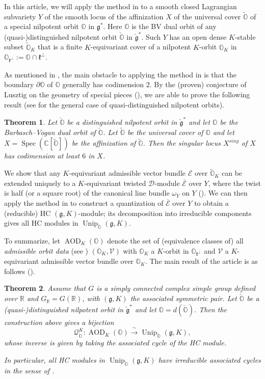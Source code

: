 \documentclass[11pt, a4paper]{amsart}
\newcommand{\C}{\mathbb{C}}
\newcommand{\g}{\mathfrak{g}}
\newcommand{\orb}{\mathbb{O}}
\newcommand{\orbk}{\orb_{K}}
\newcommand{\torbk}{\widetilde{\orb}_{K}}
\newcommand{\fg}{\mathfrak{g}}
\newcommand{\fk}{\mathfrak{k}}
\newcommand{\ckfg}{{\check{\fg}}}
\newcommand{\ckorb}{\check{\orb}}
\newcommand{\cE}{\mathcal{E}}
\newcommand{\cV}{\mathcal{V}}
\newcommand{\sD}{\mathscr{D}}
\DeclareMathOperator{\AOD}{AOD}
\DeclareMathOperator{\Unip}{Unip}
\newcommand{\AODK}{\AOD_K}
\newcommand{\UnipOv}{\Unip_{\ckorb}}
\newcommand{\R}{\mathbb{R}}
\newcommand{\quan}{\mathcal{Q}}
\newcommand{\GR}{G_\R}
\newcommand{\spec}{\operatorname{Spec}}
\newtheorem{Thm}{Theorem}[subsection]
\theoremstyle{definition}
\numberwithin{equation}{section}
\begin{document}
In this article, we will apply the method in \cite{LY} to a smooth closed Lagrangian subvariety $Y$ of the smooth locus of the affinization $X$ of the universal cover $\widetilde{\orb}$ of a special nilpotent orbit $\orb$ in $\g^*$. Here $\orb$ is the BV dual orbit of any (quasi-)distinguished nilpotent orbit $\ckorb$ in $\ckfg^*$. Such $Y$ has an open dense $K$-stable subset $\torbk$ that is a finite $K$-equivariant cover of a nilpotent $K$-orbit $\orbk$ in $\orb_{\fk^\perp} := \orb \cap \fk^\perp$. 

As mentioned in , the main obstacle to applying the method in \cite{LY} is that the boundary $\partial \orb$ of $\orb$ generally has codimension $2$. By the (proven) conjecture of Lusztig on the geometry of special pieces (), we are able to prove the following result (see  for the general case of quasi-distinguished nilpotent orbits).

\begin{Thm} \label{thm:main_codim_X_dist}
	Let $\ckorb$ be a distinguished nilpotent orbit in $\ckfg^*$ and let $\orb$ be the Barbasch--Vogan dual orbit of $\ckorb$. Let $\widetilde{\orb}$ be the universal cover of $\orb$ and let $X = \spec(\C[\widetilde{\orb}])$ be the affinization of $\widetilde{\orb}$. Then the singular locus $X^{sing}$ of $X$ has codimension at least $6$ in $X$.
\end{Thm}

We show that any $K$-equivariant admissible vector bundle $\cE$ over $\torbk$ can be extended uniquely to a $K$-equivariant twisted $\sD$-module $\overline{\cE}$ over $Y$, where the twist is half (or a square root) of the canonical line bundle $\omega_Y$ on $Y$ (). We can then apply the method in \cite{LY} to construct a quantization of $\overline{\cE}$ over $Y$ to obtain a (reducible) HC $(\g,K)$-module; its decomposition into irreducible components gives all HC modules in $\UnipOv(\g, K)$. 

To summarize, let $\AODK(\orb)$ denote the set of (equivalence classes of) all {\it admissible orbit data} (see ) $(\orbk, \cV)$ with $\orbk$ a $K$-orbit in $\orb_{\fk^\perp}$ and $\cV$ a $K$-equivariant admissible vector bundle over $\orbk$. The main result of the article is as follows ().


\begin{Thm}\label{thm:main_bij}
	Assume that $G$ is a simply connected complex simple group defined over $\R$ and $\GR = G(\R)$, with $(\g,K)$ the associated symmetric pair. Let $\ckorb$ be a (quasi-)distinguished nilpotent orbit in $\ckfg^*$ and let $\orb = d(\ckorb)$. Then the construction above gives a bijection 
	\[ \quan_{\ckorb}^K: \AODK(\orb) \xrightarrow{\ \scriptstyle\sim \ } \UnipOv(\g, K),\]
	whose inverse is given by taking the associated cycle of the HC module. 
	
	In particular, all HC modules in $\UnipOv(\g, K)$ have irreducible associated cycles in the sense of .
\end{Thm}
\end{document}
